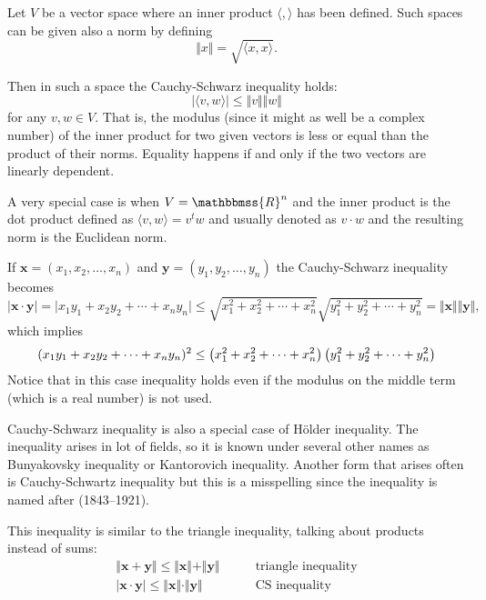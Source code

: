 \documentclass[12pt]{article}
\newcommand{\R}{\mathbbmss{R}}
\begin{document}
Let $V$ be a vector space where an inner product $\langle,\rangle$ has been defined.
Such spaces can be given also a norm by defining 
\[
\Vert x\Vert = \sqrt{\langle x,x\rangle}.
\]

Then in such a space the Cauchy-Schwarz inequality holds:
\[
\vert \langle v,w\rangle\vert\le \Vert v\Vert\Vert w\Vert
\]
for any $v,w\in V$. That is, the modulus (since it might as well be a complex number) of the inner product for two given vectors is less or equal than the product of their norms. Equality happens if and only if the two vectors are linearly dependent.


A very special case is when $V=\R^n$ and the inner product is the dot product defined as $\langle v,w\rangle  = v^t w$ and usually denoted as $v\cdot w$ and the resulting norm is the Euclidean norm.

If $\mathbf{x}=(x_1,x_2,\ldots,x_n)$ and $\mathbf{y}=(y_1,y_2,\ldots,y_n)$ the Cauchy-Schwarz inequality becomes
\[
\vert \mathbf{x}\cdot \mathbf{y}\vert=\vert x_1y_1+x_2y_2+\cdots+x_ny_n\vert \le
\sqrt{x_1^2+x_2^2+\cdots+x_n^2}\sqrt{y_1^2+y_2^2+\cdots+y_n^2}=\Vert \mathbf{x}\Vert\Vert \mathbf{y} \Vert,\]
which implies
\[
(x_1y_1+x_2y_2+\cdots+x_ny_n)\sp2 \le\left(x_1^2+x_2^2+\cdots+x_n^2\right)\left( y_1^2+y_2^2+\cdots+y_n^2\right)
\]
Notice that in this case inequality holds even if the modulus on the middle term (which is a real number) is not used.

Cauchy-Schwarz inequality is also a special case of H\"older inequality.
The inequality arises in lot of fields, so it is known under several other names as 
Bunyakovsky inequality or Kantorovich inequality. Another form that arises often is Cauchy-Schwartz inequality but this is a misspelling since the inequality is named after  (1843--1921).

This inequality is similar to the triangle inequality, talking about products instead of sums:
\begin{align*}
\Vert\mathbf{x}+\mathbf{y}\Vert\leq\Vert \mathbf{x}\Vert+\Vert \mathbf{y}\Vert & \qquad\text{triangle inequality}\\
\vert\mathbf{x}\cdot\mathbf{y}\vert\leq\Vert \mathbf{x}\Vert\cdot\Vert \mathbf{y}\Vert &\qquad \text{CS inequality}\\
\end{align*}
\end{document}
